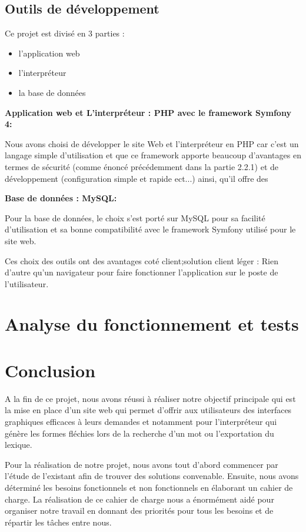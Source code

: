 \documentclass[12pt,a4paper]{article}
\begin{document}
\subsection{Outils de développement}

Ce projet est divisé en 3 parties :
\begin{itemize}  
  \item l'application web
  \item l'interpréteur
  \item la base de données
\end{itemize}

\textbf{Application web et L'interpréteur : PHP avec le framework Symfony 4:}

Nous avons choisi de développer le site Web et l'interpréteur en PHP car c'est un langage simple d'utilisation et que ce framework apporte beaucoup d'avantages en termes de sécurité (comme énoncé précédemment dans la partie 2.2.1) et de développement (configuration simple et rapide ect...) ainsi, qu'il offre des 

\smallbreak

\textbf{Base de données : MySQL:}


Pour la base de données, le choix s'est porté sur MySQL pour sa facilité d'utilisation et sa bonne compatibilité avec le framework Symfony utilisé pour le site web. 


Ces choix des outils ont des avantages coté client;solution client léger : Rien d'autre qu'un navigateur pour faire fonctionner l'application sur le poste de l'utilisateur.


\section{Analyse du fonctionnement et tests}

\section{Conclusion}
  A la fin de ce projet, nous avons réussi à réaliser notre objectif principale 
qui est la mise en place d'un site web qui permet d'offrir aux utilisateurs des interfaces graphiques 
efficaces à leurs demandes et notamment pour l'interpréteur qui génère les formes fléchies lors de la recherche d'un mot ou l'exportation du lexique.


  Pour la réalisation de notre projet, nous avons tout d'abord commencer par l'étude de l'existant afin de trouver 
des solutions convenable. Ensuite, nous avons déterminé les besoins fonctionnels et non fonctionnels en élaborant 
un cahier de charge. La réalisation de ce cahier de charge nous a énormément aidé pour organiser notre travail en donnant des priorités 
pour tous les besoins et de répartir les tâches entre nous.
  
\end{document}
